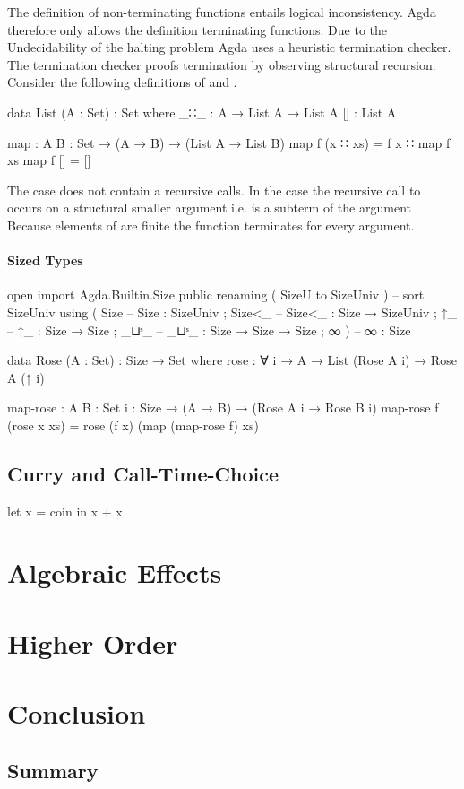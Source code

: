 \documentclass[10pt,a4paper,twoside]{report}
\begin{document}
The definition of non-terminating functions entails logical inconsistency.
Agda therefore only allows the definition terminating functions.
Due to the Undecidability of the halting problem Agda uses a heuristic termination checker.
The termination checker proofs termination by observing structural recursion.
Consider the following definitions of  and .

\begin{code}
data List (A : Set) : Set where
  _∷_  : A → List A → List A
  []   : List A

map : {A B : Set} → (A → B) → (List A → List B)
map f (x ∷ xs)  = f x ∷ map f xs
map f []        = []
\end{code}

The \AgdaInductiveConstructor{[]} case does not contain a recursive calls.
In the  case the recursive call to
 occurs on a structural smaller argument i.e.
 is a subterm of the argument
\;\;.
Because elements of  are finite the function
 terminates for every argument.

\subsubsection{Sized Types}

\begin{code}
open import Agda.Builtin.Size public
  renaming ( SizeU to SizeUniv )  --  sort SizeUniv
  using    ( Size                 --  Size   : SizeUniv
           ; Size<_               --  Size<_ : Size → SizeUniv
           ; ↑_                   --  ↑_     : Size → Size
           ; _⊔ˢ_                 --  _⊔ˢ_   : Size → Size → Size
           ; ∞ )                  --  ∞      : Size

data Rose (A : Set) : Size → Set where
  rose : ∀ {i} → A → List (Rose A i) → Rose A (↑ i)

map-rose : {A B : Set} {i : Size} → (A → B) → (Rose A i → Rose B i)
map-rose f (rose x xs) = rose (f x) (map (map-rose f) xs)
\end{code}

\section{Curry and Call-Time-Choice}
let x = coin in x + x

\chapter{Algebraic Effects}


\chapter{Higher Order}

\chapter{Conclusion}
\section{Summary}

\printbibliography
\end{document}
